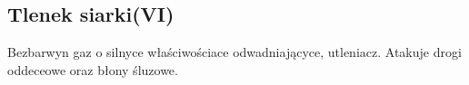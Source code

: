 \subsection{Tlenek siarki(VI) }
Bezbarwyn gaz o silnyce właściwościace odwadniającyce, utleniacz.
Atakuje drogi oddeceowe oraz błony śluzowe.
